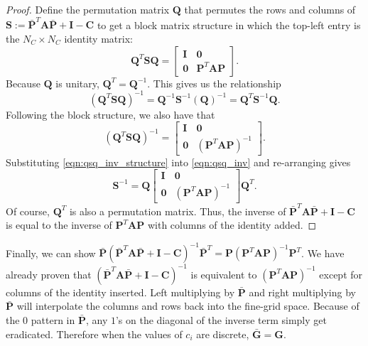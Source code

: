 \documentclass{article}
\newcommand{\mat}[1]{\bm{{#1}}}
\begin{document}
\begin{proof}
  Define the permutation matrix $\mat{Q}$ that permutes the rows and columns of $\mat{S} := \bar{\mat{P}}^T\mat{A}\bar{\mat{P}} + \mat{I} - \mat{C}$ to get a block matrix structure in which the top-left entry is the $N_C\times N_C$ identity matrix:
  \begin{equation}
    \mat{Q}^T\mat{S}\mat{Q} =
    \begin{bmatrix}
      \mat{I} & \mat{0} \\
      \mat{0} & \mat{P}^T\mat{A}\mat{P}
    \end{bmatrix}. \label{eqn:qsq}
  \end{equation}
  Because $\mat{Q}$ is unitary, $\mat{Q}^T=\mat{Q}^{-1}$.  This gives us the relationship
  \begin{equation}
    \left(\mat{Q}^T\mat{S}\mat{Q}\right)^{-1} = \mat{Q}^{-1}\mat{S}^{-1}\left(\mat{Q}\right)^{-1} = \mat{Q}^T\mat{S}^{-1}\mat{Q}. \label{eqn:qsq_inv}
  \end{equation}
  Following the block structure, we also have that
  \begin{equation}
    \left(\mat{Q}^T\mat{S}\mat{Q}\right)^{-1} = \begin{bmatrix}
      \mat{I} & \mat{0} \\
      \mat{0} & \left(\mat{P}^T\mat{A}\mat{P}\right)^{-1}
    \end{bmatrix}. \label{eqn:qsq_inv_structure}
  \end{equation}
  Substituting \eqref{eqn:qsq_inv_structure} into \eqref{eqn:qsq_inv} and re-arranging gives
  \begin{equation}
    \mat{S}^{-1} = \mat{Q} \begin{bmatrix}
      \mat{I} & \mat{0} \\
      \mat{0} & \left(\mat{P}^T\mat{A}\mat{P}\right)^{-1}
    \end{bmatrix} \mat{Q}^T.
  \end{equation}
  Of course, $\mat{Q}^T$ is also a permutation matrix.  Thus, the inverse of $\bar{\mat{P}}^T\mat{A}\bar{\mat{P}} + \mat{I} - \mat{C}$ is equal to the inverse of $\mat{P}^T\mat{A}\mat{P}$ with columns of the identity added.
\end{proof}

Finally, we can show $\bar{\mat{P}}\left(\bar{\mat{P}}^T \mat{A} \bar{\mat{P}} + \mat{I} - \mat{C}\right)^{-1} \bar{\mat{P}}^T = \mat{P}\left(\mat{P}^T\mat{A}\mat{P}\right)^{-1}\mat{P}^T$.  We have already proven that $\left(\bar{\mat{P}}^T \mat{A} \bar{\mat{P}} + \mat{I} - \mat{C}\right)^{-1}$ is equivalent to $\left(\mat{P}^T\mat{A}\mat{P}\right)^{-1}$ except for columns of the identity inserted.  Left multiplying by $\bar{\mat{P}}$ and right multiplying by $\bar{\mat{P}}$ will interpolate the columns and rows back into the fine-grid space.  Because of the $0$ pattern in $\bar{\mat{P}}$, any $1$'s on the diagonal of the inverse term simply get eradicated.  Therefore when the values of $c_i$ are discrete, $\bar{\mat{G}}=\mat{G}$.
\end{document}
